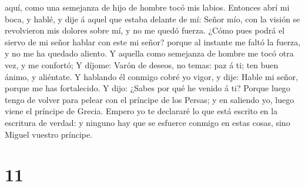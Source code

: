 aquí, como una semejanza de hijo de hombre tocó mis labios. Entonces
abrí mi boca, y hablé, y dije á aquel que estaba delante de mí: Señor
mío, con la visión se revolvieron mis dolores sobre mí, y no me quedó
fuerza.  ¿Cómo pues podrá el siervo de mi señor hablar
con este mi señor? porque al instante me faltó la fuerza, y no me ha
quedado aliento.  Y aquella como semejanza de hombre me
tocó otra vez, y me confortó;  Y díjome: Varón de deseos,
no temas: paz á ti; ten buen ánimo, y aliéntate. Y hablando él conmigo
cobré yo vigor, y dije: Hable mi señor, porque me has fortalecido.
 Y dijo: ¿Sabes por qué he venido á ti? Porque luego
tengo de volver para pelear con el príncipe de los Persas; y en saliendo
yo, luego viene el príncipe de Grecia.  Empero yo te
declararé lo que está escrito en la escritura de verdad: y ninguno hay
que se esfuerce conmigo en estas cosas, sino Miguel vuestro príncipe.

\hypertarget{section-10}{%
\section{11}\label{section-10}}

